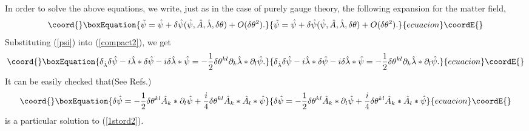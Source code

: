 \documentclass[a4paper,a4paper]{article}%
\begin{document}
In order to solve the above equations, we write, just as in the case of purely
gauge theory, the following expansion for the matter field,%
\begin{equation}\coord{}\boxEquation{
\tilde{\psi}=\hat{\psi}+\delta\hat{\psi}(\hat{\psi},\hat{A},\hat{\lambda
},\delta\theta)+O(\delta\theta^{2}).\label{psi}
}{
\tilde{\psi}=\hat{\psi}+\delta\hat{\psi}(\hat{\psi},\hat{A},\hat{\lambda
},\delta\theta)+O(\delta\theta^{2}).}{ecuacion}\coordE{}\end{equation}
Substituting (\ref{psi}) into (\ref{compact2}), we get%
\begin{equation}\coord{}\boxEquation{
\delta_{\hat{\lambda}}\delta\hat{\psi}-i\hat{\lambda}\ast\delta\hat{\psi
}-i\delta\hat{\lambda}\ast\hat{\psi}=-\frac{1}{2}\delta\theta^{kl}\partial
_{k}\hat{\lambda}\ast\partial_{l}\hat{\psi}.\label{1stord2}
}{
\delta_{\hat{\lambda}}\delta\hat{\psi}-i\hat{\lambda}\ast\delta\hat{\psi
}-i\delta\hat{\lambda}\ast\hat{\psi}=-\frac{1}{2}\delta\theta^{kl}\partial
_{k}\hat{\lambda}\ast\partial_{l}\hat{\psi}.}{ecuacion}\coordE{}\end{equation}
It can be easily checked that(See Refs.\cite{3})
\begin{equation}\coord{}\boxEquation{
\delta\hat{\psi}=-\frac{1}{2}\delta\theta^{kl}\hat{A}_{k}\ast\partial_{l}
\hat{\psi}+\frac{i}{4}\delta\theta^{kl}\hat{A}_{k}\ast\hat{A}_{l}\ast\hat
{\psi}\label{psi2}
}{
\delta\hat{\psi}=-\frac{1}{2}\delta\theta^{kl}\hat{A}_{k}\ast\partial_{l}
\hat{\psi}+\frac{i}{4}\delta\theta^{kl}\hat{A}_{k}\ast\hat{A}_{l}\ast\hat
{\psi}}{ecuacion}\coordE{}\end{equation}
is a particular solution to (\ref{1stord2}).
\end{document}
